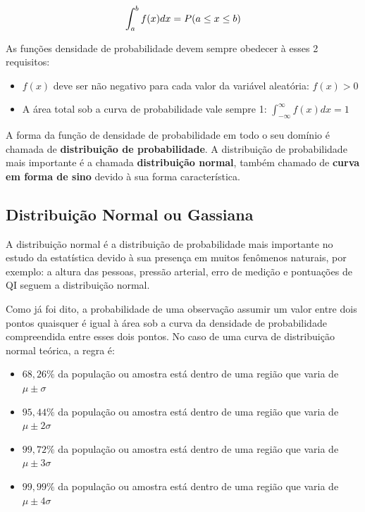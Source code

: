\[\large \int_{a}^{b} f(x)dx = P(a\leq x\leq b)\]

As funções densidade de probabilidade devem sempre obedecer à esses 2 requisitos:
\begin{itemize}
\item $f(x)$ deve ser não negativo para cada valor da variável aleatória: $f(x) > 0$
\item A área total sob a curva de probabilidade vale sempre 1: $\int_{-\infty }^{\infty} f(x)dx = 1$
\end{itemize}

A forma da função de densidade de probabilidade em todo o seu domínio é chamada de \textbf{distribuição de probabilidade}. A distribuição de probabilidade mais importante é a chamada \textbf{distribuição normal}, também chamado de \textbf{curva em forma de sino} devido à sua forma característica.

\subsection{Distribuição Normal ou Gassiana}

A distribuição normal é a distribuição de probabilidade mais importante no estudo da estatística devido à sua presença em muitos fenômenos naturais, por exemplo: a altura das pessoas, pressão arterial, erro de medição e pontuações de QI seguem a distribuição normal.

Como já foi dito, a probabilidade de uma observação assumir um valor entre dois pontos quaisquer é igual à área sob a curva da densidade de probabilidade compreendida entre esses dois pontos. No caso de uma curva de distribuição normal teórica, a regra é: 

\begin{itemize} 

\item $68,26\%$ da população ou amostra está dentro de uma região que varia de $\mu \pm \sigma$ 
\item $95,44\%$ da população ou amostra está dentro de uma região que varia de $\mu \pm 2\sigma$
\item $99,72\%$ da população ou amostra está dentro de uma região que varia de $\mu \pm 3\sigma$
\item $99,99\%$ da população ou amostra está dentro de uma região que varia de $\mu \pm 4\sigma$ 

\end{itemize}

